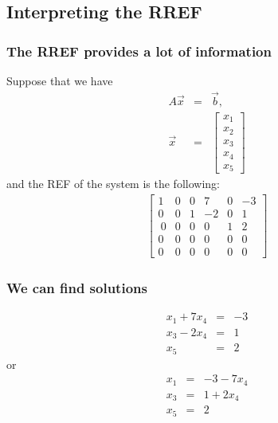 \subsection{Interpreting the RREF}

\begin{frame}
  \frametitle{The RREF provides a lot of information}

  Suppose that we have
  \begin{eqnarray*}
    A\vec{x} & = & \vec{b}, \\
    \vec{x} & = &
    \left[ \begin{array}{r}x_1\\x_2\\x_3\\x_4\\x_5\end{array}\right]
  \end{eqnarray*}
  and the REF of the system is the following:
  \begin{eqnarray*}
    \left[
      \begin{array}{rrrrr|r}
        1 & 0 & 0 &  7 & 0 & -3 \\
        0 & 0 & 1 & -2 & 0 &  1 \\\
        0 & 0 & 0 &  0 & 1 &  2 \\
        0 & 0 & 0 &  0 & 0 &  0 \\
        0 & 0 & 0 &  0 & 0 &  0
      \end{array}
    \right]
  \end{eqnarray*}

\end{frame}


\begin{frame}
  \frametitle{We can find solutions}


  \begin{eqnarray*}
    x_1 + 7x_4 & = & -3 \\
    x_3 - 2x_4 & = & 1 \\
    x_5 & = & 2
  \end{eqnarray*}
  or
  \begin{eqnarray*}
    x_1  & = & -3 - 7x_4\\
    x_3  & = &  1 + 2x_4\\
    x_5  & = &  2
  \end{eqnarray*}

\end{frame}

